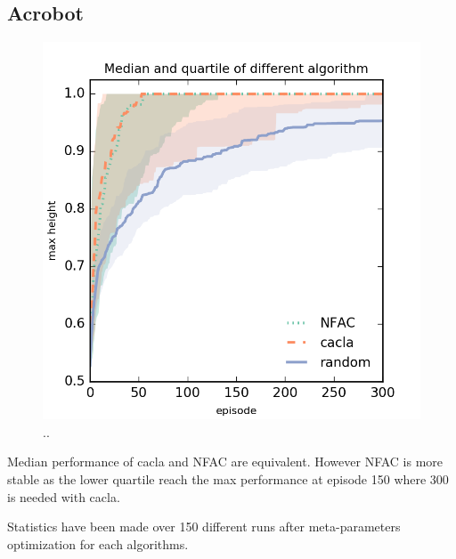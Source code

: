 
\subsection{Acrobot}

\begin{figure}[h]
	\begin{center}
		\includegraphics{result_plotting/adacrobot-1ddl.png}
		\caption{..}
		\label{image:adacrobot}
	\end{center}
\end{figure}
Median performance of cacla and NFAC are equivalent. However NFAC is more stable as the lower quartile reach the max performance
at episode 150 where 300 is needed with cacla.

Statistics have been made over 150 different runs after meta-parameters optimization for each algorithms.

